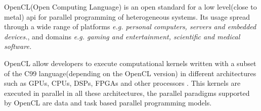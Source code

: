 \par{OpenCL(Open Computing Language) is an open standard for a low level(close to metal) api for parallel programming of 
    heterogeneous systems. Its usage spread through a wide range of platforms \emph{e.g. personal computers, servers and 
    embedded devices.}, and domains \emph{e.g. gaming and entertainment, scientific and medical software.}
    \cite{khronos,nvidia_opencl,opencl12}}

\par{OpenCL allow developers to execute computational kernels written with a subset of the C99 language(depending on the OpenCL 
    version) in different architectures \cite{nvidia_opencl} such as GPUs, CPUs, DSPs, FPGAs and other processors 
    \cite{wikipedia_opencl}. This kernels are executed in parallel in all these architectures, the parallel paradigms supported by
    OpenCL are data and task based parallel programming models\cite{opencl12}.}
